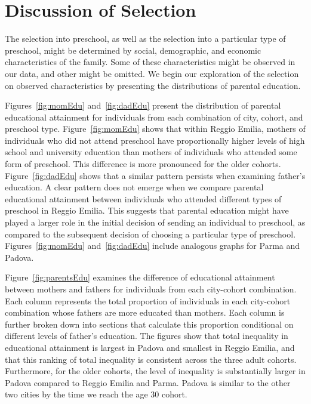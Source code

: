 \section{Discussion of Selection}
\label{sec:selection}

The selection into preschool, as well as the selection into a particular type of preschool, might be determined by social, demographic, and economic characteristics of the family. Some of these characteristics might be observed in our data, and other might be omitted. We begin our exploration of the selection on observed characteristics by presenting the distributions of parental education.

Figures~\ref{fig:momEdu} and~\ref{fig:dadEdu} present the distribution of parental educational attainment for individuals from each combination of city, cohort, and preschool type. Figure~\ref{fig:momEdu} shows that within Reggio Emilia, mothers of individuals who did not attend preschool have proportionally higher levels of high school and university education than mothers of individuals who attended some form of preschool. This difference is more pronounced for the older cohorts. Figure~\ref{fig:dadEdu} shows that a similar pattern persists when examining father's education. A clear pattern does not emerge when we compare parental educational attainment between individuals who attended different types of preschool in Reggio Emilia. This suggests that parental education might have played a larger role in the initial decision of sending an individual to preschool, as compared to the subsequent decision of choosing a particular type of preschool. Figures~\ref{fig:momEdu} and~\ref{fig:dadEdu} include analogous graphs for Parma and Padova.

Figure~\ref{fig:parentsEdu} examines the difference of educational attainment between mothers and fathers for individuals from each city-cohort combination. Each column represents the total proportion of individuals in each city-cohort combination whose fathers are more educated than mothers. Each column is further broken down into sections that calculate this proportion conditional on different levels of father's education. The figures show that total inequality in educational attainment is largest in Padova and smallest in Reggio Emilia, and that this ranking of total inequality is consistent across the three adult cohorts. Furthermore, for the older cohorts, the level of inequality is substantially larger in Padova compared to Reggio Emilia and Parma. Padova is similar to the other two cities by the time we reach the age 30 cohort. 



